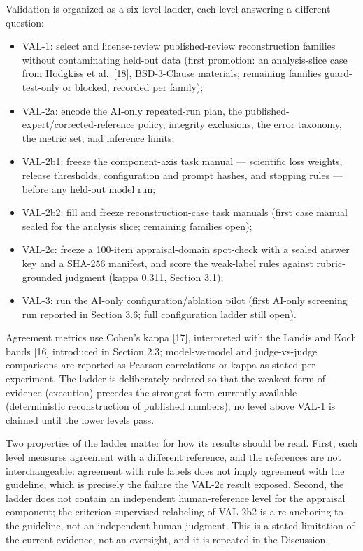 \documentclass[
]{article}
\providecommand{\tightlist}{%
  \setlength{\itemsep}{0pt}\setlength{\parskip}{0pt}}
\begin{document}
Validation is organized as a six-level ladder, each level answering a
different question:

\begin{itemize}
\tightlist
\item
  VAL-1: select and license-review published-review reconstruction
  families without contaminating held-out data (first promotion: an
  analysis-slice case from Hodgkiss et al.~{[}18{]}, BSD-3-Clause
  materials; remaining families guard-test-only or blocked, recorded per
  family);
\item
  VAL-2a: encode the AI-only repeated-run plan, the
  published-expert/corrected-reference policy, integrity exclusions, the
  error taxonomy, the metric set, and inference limits;
\item
  VAL-2b1: freeze the component-axis task manual --- scientific loss
  weights, release thresholds, configuration and prompt hashes, and
  stopping rules --- before any held-out model run;
\item
  VAL-2b2: fill and freeze reconstruction-case task manuals (first case
  manual sealed for the analysis slice; remaining families open);
\item
  VAL-2c: freeze a 100-item appraisal-domain spot-check with a sealed
  answer key and a SHA-256 manifest, and score the weak-label rules
  against rubric-grounded judgment (kappa 0.311, Section 3.1);
\item
  VAL-3: run the AI-only configuration/ablation pilot (first AI-only
  screening run reported in Section 3.6; full configuration ladder still
  open).
\end{itemize}

Agreement metrics use Cohen's kappa {[}17{]}, interpreted with the
Landis and Koch bands {[}16{]} introduced in Section 2.3; model-vs-model
and judge-vs-judge comparisons are reported as Pearson correlations or
kappa as stated per experiment. The ladder is deliberately ordered so
that the weakest form of evidence (execution) precedes the strongest
form currently available (deterministic reconstruction of published
numbers); no level above VAL-1 is claimed until the lower levels pass.

Two properties of the ladder matter for how its results should be read.
First, each level measures agreement with a different reference, and the
references are not interchangeable: agreement with rule labels does not
imply agreement with the guideline, which is precisely the failure the
VAL-2c result exposed. Second, the ladder does not contain an
independent human-reference level for the appraisal component; the
criterion-supervised relabeling of VAL-2b2 is a re-anchoring to the
guideline, not an independent human judgment. This is a stated
limitation of the current evidence, not an oversight, and it is repeated
in the Discussion.
\end{document}
